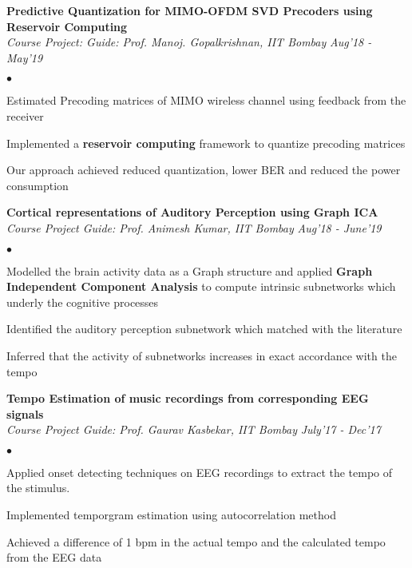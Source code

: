 \documentclass[margin,line, 9pt]{res}
\newenvironment{list2}{
  \begin{list}{$\bullet$}{%
      \setlength{\itemsep}{0.03in}
      \setlength{\parsep}{0in} \setlength{\parskip}{0in}
      \setlength{\topsep}{0in} \setlength{\partopsep}{0in} 
      \setlength{\leftmargin}{0.2in}}}{\end{list}}
\begin{document}
%
%
{\bf Predictive Quantization for MIMO-OFDM SVD Precoders using Reservoir Computing} \\
{\em Course Project: Guide: Prof. Manoj. Gopalkrishnan, IIT Bombay} \hfill {\it Aug'18 - May'19}\\
\vspace*{-.13in}
\begin{list2}
\item Estimated Precoding matrices of MIMO wireless channel using feedback from the receiver
\item Implemented a \textbf{reservoir computing} framework to quantize precoding matrices %
\item Our approach achieved reduced quantization, lower BER and reduced the power consumption

\end{list2}
%
%
{\bf Cortical representations of Auditory Perception using Graph ICA} \\
{\em Course Project Guide: Prof. Animesh Kumar, IIT Bombay} \hfill {\it Aug'18 - June'19}\\
\vspace*{-.13in}
\begin{list2}
\item Modelled the brain activity data as a Graph structure and applied \textbf{Graph Independent Component Analysis} to compute intrinsic subnetworks which underly the cognitive processes
\item Identified the auditory perception subnetwork which matched with the literature
\item Inferred that the activity of subnetworks increases in exact accordance with the tempo
\end{list2}
%
{\bf Tempo Estimation of music recordings from corresponding EEG signals} \\
{\em Course Project Guide: Prof. Gaurav Kasbekar, IIT Bombay} \hfill {\it July'17 - Dec'17}\\
\vspace*{-.13in}
\begin{list2}
\item Applied onset detecting techniques on EEG recordings to extract the tempo of the stimulus.
\item Implemented temporgram estimation using autocorrelation method
\item Achieved a difference of 1 bpm in the actual tempo and the calculated tempo from the EEG data 

\end{list2}
\end{document}
